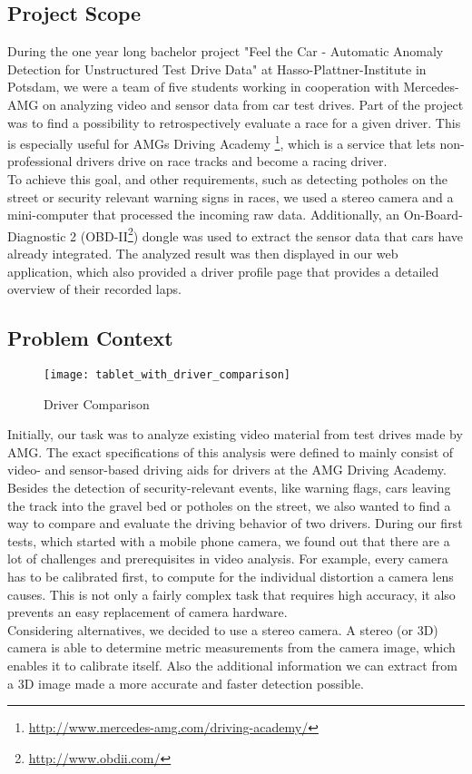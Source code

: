 \subsection{Project Scope}
During the one year long bachelor project "Feel the Car - Automatic A\-no\-ma\-ly Detection for Unstructured Test Drive Data" at Hasso-Plattner-Institute in Potsdam, we were a team of five students working in cooperation with Mercedes-AMG on analyzing video and sensor data from car test drives.
Part of the project was to find a possibility to retrospectively evaluate a race for a given driver. This is especially useful for AMGs Driving Academy \footnote{\url{http://www.mercedes-amg.com/driving-academy/}}, which is a service that lets non-professional drivers drive on race tracks and become a racing driver.\\
To achieve this goal, and other requirements, such as detecting potholes on the street or security relevant warning signs in races, we used a stereo camera and a mini-computer that processed the incoming raw data.
Additionally, an On-Board-Diagnostic 2 (OBD-II\footnote{\url{http://www.obdii.com/}}) dongle was used to extract the sensor data that cars have already integrated.
The analyzed result was then displayed in our web application, which also provided a driver profile page that provides a detailed overview of their recorded laps.
\clearpage

\subsection{Problem Context}
\label{sec:context}

\begin{figure}[!ht]
	\centering
	\texttt{[image: tablet\_with\_driver\_comparison]}
	\caption{Driver Comparison}
	\label{fig:comparison_with_overlay}
\end{figure}

Initially, our task was to analyze existing video material from test drives made by AMG. The exact specifications of this analysis were defined to mainly consist of video- and sensor-based driving aids for drivers at the AMG Driving Academy. Besides the detection of security-relevant events, like warning flags, cars leaving the track into the gravel bed or potholes on the street, we also wanted to find a way to compare and evaluate the driving behavior of two drivers.
During our first tests, which started with a mobile phone camera, we found out that there are a lot of challenges and prerequisites in video analysis. For example, every camera has to be calibrated first, to compute for the individual distortion a camera lens causes. This is not only a fairly complex task that requires high accuracy, it also prevents an easy replacement of camera hardware.\\
Considering alternatives, we decided to use a stereo camera. A stereo (or 3D) camera is able to determine metric measurements from the camera image, which enables it to calibrate itself. Also the additional information we can extract from a 3D image made a more accurate and faster detection possible.\\

